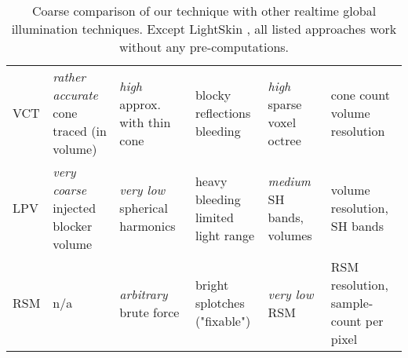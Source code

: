 \documentclass[thesis.tex]{subfiles}
\begin{document}
\begin{landscape}
\begin{table}[h]
\begin{tabular}{llllll}
\specialVspace

\makecell[l]{VCT \\ \cite{bib:voxelconetracing}} & \makecell[l]{\emph{rather accurate}\\cone traced (in volume)} & \makecell[l]{\emph{high}\\approx. with thin cone} & \makecell[l]{blocky reflections \\ bleeding} & \makecell[l]{\emph{high}\\sparse voxel octree} & \makecell[l]{cone count\\ volume resolution} \\

\specialVspace

\makecell[l]{LPV \\ \cite{bib:lpt}} & \makecell[l]{\emph{very coarse}\\injected blocker volume} & \makecell[l]{\emph{very low}\\spherical harmonics} & \makecell[l]{heavy bleeding\\limited light range} & \makecell[l]{\emph{medium}\\SH bands, volumes}  & \makecell[l]{volume resolution,\\SH bands} \\

\specialVspace

\makecell[l]{RSM \\ \cite{bib:reflectiveshadowmaps}} & n/a & \makecell[l]{\emph{arbitrary}\\brute force} & \makecell[l]{bright splotches \\ ("fixable")} & \makecell[l]{\emph{very low}\\RSM} & \makecell[l]{RSM resolution,\\sample-count per pixel}\\


\bottomrule
\end{tabular}
\caption{Coarse comparison of our technique with other realtime global illumination techniques. Except LightSkin \cite{bib:LightskinPaper}, all listed approaches work without any pre-computations.}
\label{tab:comparision}
\end{table}

\end{landscape}


\subfilebib %
\end{document}
